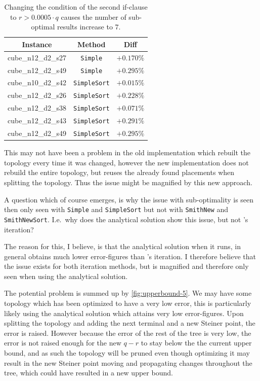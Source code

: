 \begin{table}[htbp]
  \centering
  \begin{tabular}{ccc}
    \toprule
    Instance           & Method              & Diff       \\
    \midrule
    cube\_n12\_d2\_s27 & \texttt{Simple}     & $+0.170\%$ \\
    cube\_n12\_d2\_s49 & \texttt{Simple}     & $+0.295\%$ \\
    cube\_n10\_d2\_s42 & \texttt{SimpleSort} & $+0.015\%$ \\
    cube\_n12\_d2\_s26 & \texttt{SimpleSort} & $+0.228\%$ \\
    cube\_n12\_d2\_s38 & \texttt{SimpleSort} & $+0.071\%$ \\
    cube\_n12\_d2\_s43 & \texttt{SimpleSort} & $+0.291\%$ \\
    cube\_n12\_d2\_s49 & \texttt{SimpleSort} & $+0.295\%$ \\
    \bottomrule
  \end{tabular}
  \caption[Sub-optimal results with condition $r > 0.0005 \cdot q$]{Changing
    the condition of the second if-clause to $r > 0.0005 \cdot q$ causes the
    number of sub-optimal results increase to $7$.\label{tab:correctness-errors-2}}
\end{table}

This may not have been a problem in the old implementation which rebuilt the
topology every time it was changed, however the new implementation does not
rebuild the entire topology, but reuses the already found placements when
splitting the topology. Thus the issue might be magnified by this new approach. 

A question which of course emerges, is why the issue with sub-optimality is seen
then only seen with \texttt{Simple} and \texttt{SimpleSort} but not with
\texttt{SmithNew} and \texttt{SmithNewSort}. I.e.\ why does the analytical
solution show this issue, but not \citeauthor{smith1992}'s iteration?

The reason for this, I believe, is that the analytical solution when it runs, in
general obtains much lower error-figures than \citeauthor{smith1992}'s
iteration. I therefore believe that the issue exists for both iteration methods,
but is magnified and therefore only seen when using the analytical solution.

The potential problem is summed up by \cref{fig:upperbound-5}. We may have some
topology which has been optimized to have a very low error, this is particularly
likely using the analytical solution which attains very low error-figures. Upon
splitting the topology and adding the next terminal and a new Steiner point, the
error is raised. However because the error of the rest of the tree is very low,
the error is not raised enough for the new $q-r$ to stay below the the current
upper bound, and as such the topology will be pruned even though optimizing it
may result in the new Steiner point moving and propagating changes throughout
the tree, which could have resulted in a new upper bound.

